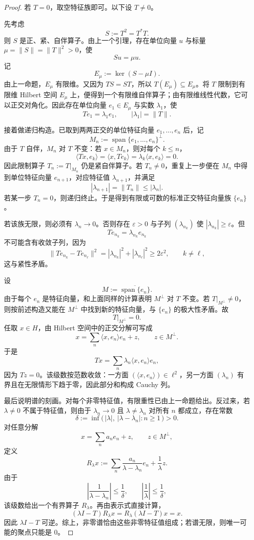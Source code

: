 \begin{proof}
若 $T=0$，取空特征族即可。以下设 $T\neq 0$。

先考虑
\[
S:=T^2=T^\ast T.
\]
则 $S$ 是正、紧、自伴算子。由上一个引理，存在单位向量 $u$ 与标量 $\mu=\|S\|=\|T\|^2>0$，使
\[
Su=\mu u.
\]
记
\[
E_\mu:=\ker(S-\mu I).
\]
由上一命题，$E_\mu$ 有限维。又因为 $TS=ST$，所以 $T(E_\mu)\subseteq E_\mu$。将 $T$ 限制到有限维 Hilbert 空间 $E_\mu$ 上，便得到一个有限维自伴算子；由有限维线性代数，它可以正交对角化。因此存在单位向量 $e_1\in E_\mu$ 与实数 $\lambda_1$，使
\[
Te_1=\lambda_1 e_1,
\qquad
|\lambda_1|=\|T\|.
\]

接着做递归构造。已取到两两正交的单位特征向量 $e_1,\dots,e_n$ 后，记
\[
M_n:=\operatorname{span}\{e_1,\dots,e_n\}^\perp.
\]
由于 $T$ 自伴，$M_n$ 对 $T$ 不变：若 $x\in M_n$，则对每个 $k\le n$，
\[
\langle Tx,e_k\rangle=\langle x,Te_k\rangle=\lambda_k\langle x,e_k\rangle=0.
\]
因此限制算子 $T_n:=T|_{M_n}$ 仍是紧自伴算子。若 $T_n\neq 0$，重复上一步便在 $M_n$ 中得到单位特征向量 $e_{n+1}$，对应特征值 $\lambda_{n+1}$，并满足
\[
|\lambda_{n+1}|=\|T_n\|\le |\lambda_n|.
\]
若某一步 $T_n=0$，则递归终止。于是得到有限或可数的标准正交特征向量族 $\{e_n\}$。

若该族无限，则必须有 $\lambda_n\to 0$。否则存在 $\varepsilon>0$ 与子列 $(\lambda_{n_k})$ 使 $|\lambda_{n_k}|\ge \varepsilon$。但
\[
Te_{n_k}=\lambda_{n_k}e_{n_k}
\]
不可能含有收敛子列，因为
\[
\|Te_{n_k}-Te_{n_\ell}\|^2
=|\lambda_{n_k}|^2+|\lambda_{n_\ell}|^2
\ge 2\varepsilon^2,\qquad k\neq \ell,
\]
这与紧性矛盾。

设
\[
M:=\overline{\operatorname{span}\{e_n\}}.
\]
由于每个 $e_n$ 是特征向量，和上面同样的计算表明 $M^\perp$ 对 $T$ 不变。若 $T|_{M^\perp}\neq 0$，则按前述构造又能在 $M^\perp$ 中找到新的特征向量，与 $\{e_n\}$ 的极大性矛盾。故
\[
T|_{M^\perp}=0.
\]
任取 $x\in H$，由 Hilbert 空间中的正交分解可写成
\[
x=\sum_n \langle x,e_n\rangle e_n+z,\qquad z\in M^\perp.
\]
于是
\[
Tx=\sum_n \lambda_n \langle x,e_n\rangle e_n,
\]
因为 $Tz=0$。该级数按范数收敛：一方面 $(\langle x,e_n\rangle)\in \ell^2$，另一方面 $(\lambda_n)$ 有界且在无限情形下趋于零，因此部分和构成 Cauchy 列。

最后说明谱的刻画。对每个非零特征值，有限重性已由上一命题给出。反过来，若 $\lambda\neq 0$ 不属于特征值，则由于 $\lambda_n\to 0$ 且 $\lambda\neq \lambda_n$ 对所有 $n$ 都成立，存在常数
\[
\delta:=\inf\bigl(\,|\lambda|,\ |\lambda-\lambda_n|:n\ge 1\,\bigr)>0.
\]
对任意分解
\[
x=\sum_n a_n e_n+z,\qquad z\in M^\perp,
\]
定义
\[
R_\lambda x:=\sum_n \frac{a_n}{\lambda-\lambda_n}e_n+\frac1\lambda z.
\]
由于
\[
\left|\frac1{\lambda-\lambda_n}\right|\le \frac1\delta,
\qquad
\left|\frac1\lambda\right|\le \frac1\delta,
\]
该级数给出一个有界算子 $R_\lambda$。再由表示式直接计算，
\[
(\lambda I-T)R_\lambda x=R_\lambda(\lambda I-T)x=x.
\]
因此 $\lambda I-T$ 可逆。综上，非零谱恰由这些非零特征值组成；若谱无限，则唯一可能的聚点只能是 $0$。
\end{proof}

